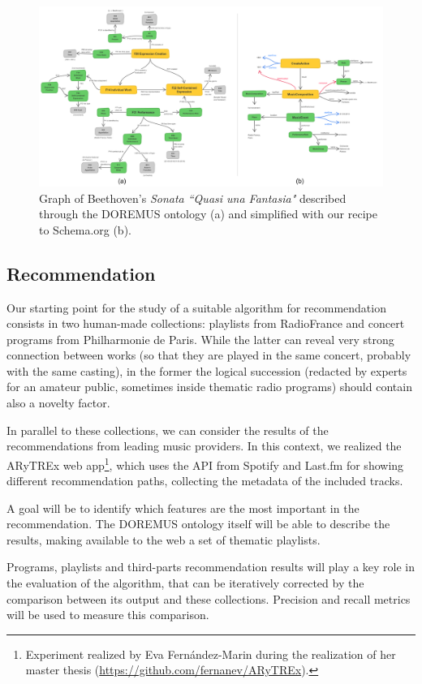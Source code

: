 \documentclass{llncs}
\begin{document}
\begin{figure}
\includegraphics[width=12cm]{img/Beethoven-mapping.png}
\centering
\caption{Graph of Beethoven's \textit{Sonata ``Quasi una Fantasia"} described through the DOREMUS ontology (a) and simplified with our recipe to Schema.org  (b).}
\label{fig:beethoven-mapping}
\end{figure}


\subsection{Recommendation} Our starting point for the study of a suitable algorithm for recommendation consists in two human-made collections: playlists from RadioFrance and concert programs from Philharmonie de Paris. While the latter can reveal very strong connection between works (so that they are played in the same concert, probably with the same casting), in the former the logical succession (redacted by experts for an amateur public, sometimes inside thematic radio programs) should contain also a novelty factor.

In parallel to these collections, we can consider the results of the recommendations from leading music providers. In this context, we realized the ARyTREx web app\footnote{Experiment realized by Eva Fernández-Marin during the realization of her master thesis (\url{https://github.com/fernanev/ARyTREx}).}, which uses the API from Spotify and Last.fm for showing different recommendation paths, collecting the metadata of the included tracks. 

A goal will be to identify which features are the most important in the recommendation. The DOREMUS ontology itself will be able to describe the results, making available to the web a set of thematic playlists.

Programs, playlists and third-parts recommendation results will play a key role in the evaluation of the algorithm, that can be iteratively corrected by the comparison between its output and these collections. Precision and recall metrics will be used to measure this comparison.
\end{document}
